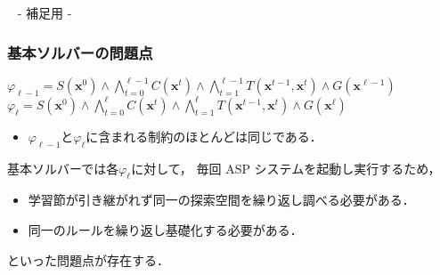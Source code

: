 \appendix
\backupbegin

\begin{frame}{~}
 \centering
 - 補足用 -
\end{frame} 

\begin{frame}\frametitle{基本ソルバーの問題点}

  \begin{block}{}
    \centering
    $
    \varphi_{\ell-1} = S(\bm{x}^0)
    \land \bigwedge_{t=0}^{\ell-1} C(\bm{x}^t) 
    \land \bigwedge_{t=1}^{\ell-1} T(\bm{x}^{t-1},\bm{x}^{t})
    \land G(\bm{x}^{\ell-1})
    $
    $
      \varphi_{\ell} = S(\bm{x}^0)
      \land \bigwedge_{t=0}^{\ell} C(\bm{x}^t) 
      \land \bigwedge_{t=1}^{\ell} T(\bm{x}^{t-1},\bm{x}^{t})
      \land G(\bm{x}^\ell)
    $
  \end{block}
  
  
  \begin{itemize}
    \item $\varphi_{\ell-1}$と$\varphi_{\ell}$に含まれる制約のほとんどは同じである．
  \end{itemize}
  \begin{exampleblock}{}
    \centering
      \scalebox{0.8}{}
  \end{exampleblock}

  \bigskip

  基本ソルバーでは各$\varphi_{\ell}$に対して，
  毎回 ASP システムを起動し実行するため，
  \begin{itemize}
    \item 学習節が引き継がれず同一の探索空間を繰り返し調べる必要がある．
    \item 同一のルールを繰り返し基礎化する必要がある．
  \end{itemize}
  といった問題点が存在する．

\end{frame}
